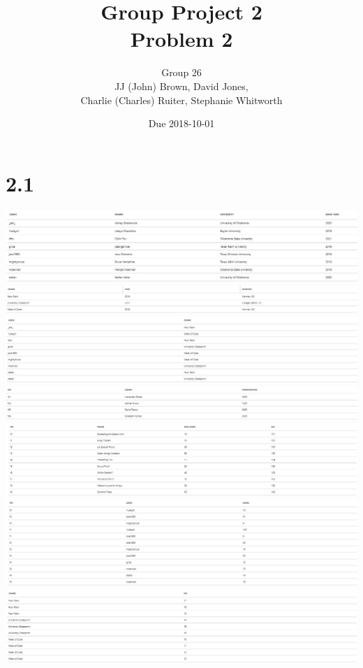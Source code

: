 \documentclass{article}
\title{Group Project 2\\Problem 2}
\author{Group 26\\JJ (John) Brown, David Jones,\\Charlie (Charles) Ruiter, Stephanie Whitworth}
\date{Due 2018-10-01}
\begin{document}
\maketitle

\section{2.1}
\includegraphics[width=\textwidth]{img/query-outputs/2_1_1.JPG}
\includegraphics[width=\textwidth]{img/query-outputs/2_1_2.JPG}
\includegraphics[width=\textwidth]{img/query-outputs/2_1_3.JPG}
\includegraphics[width=\textwidth]{img/query-outputs/2_1_4.JPG}
\includegraphics[width=\textwidth]{img/query-outputs/2_1_5.JPG}
\includegraphics[width=\textwidth]{img/query-outputs/2_1_6.JPG}
\includegraphics[width=\textwidth]{img/query-outputs/2_1_7.JPG}
\end{document}
